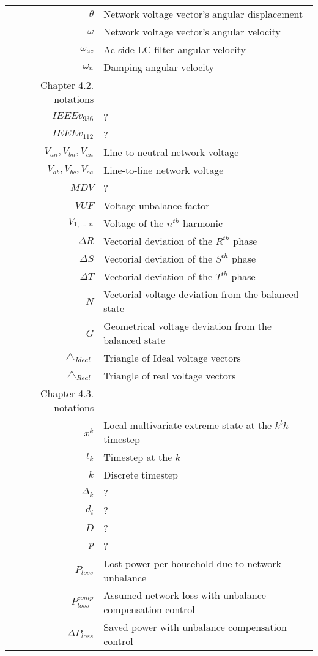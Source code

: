 \begin{longtable}{r l}
  $\theta$                          & Network voltage vector’s angular displacement\\
  $\omega$                          & Network voltage vector’s angular velocity\\
  $\omega_{ac}$                     & Ac side LC filter angular velocity\\
  $\omega_{n}$                      & Damping angular velocity\\
  \hline
Chapter 4.2. notations&\\
  $IEEEv_{936}$                         & ?\\
  $IEEEv_{112}$                         & ?\\
  $V_{an},V_{bn},V_{cn}$            & Line-to-neutral network voltage\\
  $V_{ab},V_{bc},V_{ca}$            & Line-to-line network voltage\\
  $MDV$                             & ?\\
  $VUF$                             & Voltage unbalance factor\\
  $V_{1,\dots,n}$                   & Voltage of the $n^{th}$ harmonic\\
  $\Delta R$                        & Vectorial deviation of the $R^{th}$ phase\\
  $\Delta S$                        & Vectorial deviation of the $S^{th}$ phase\\
  $\Delta T$                        & Vectorial deviation of the $T^{th}$ phase\\
  $N$                               & Vectorial voltage deviation from the balanced state\\
  $G$                               & Geometrical voltage deviation from the balanced state\\
  $\bigtriangleup_{Ideal}$          & Triangle of Ideal voltage vectors\\
  $\bigtriangleup_{Real}$           & Triangle of real voltage vectors\\
  \hline
  Chapter 4.3. notations&\\
  $x^{k}$                           & Local multivariate extreme state at the $k^th$ timestep\\
  $t_k$                             & Timestep at the $k$\\
  $k$                               & Discrete timestep\\
  $\Delta_k$                        & ?\\
  $d_i$                             & ?\\
  $D$                               & ?\\
  $p$                               & ?\\
  $P_{loss}$                        & Lost power per household due to network unbalance\\
  $P^{comp}_{loss}$                 & Assumed network loss with unbalance compensation control\\
  $\Delta P_{loss}$                 & Saved power with unbalance compensation control\\
\hline
\end{longtable}

